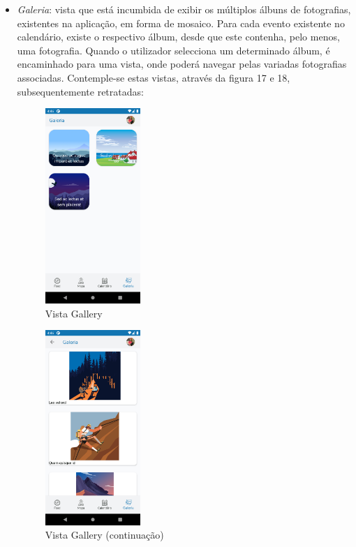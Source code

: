\documentclass[12pt]{report}
\begin{document}
\begin{itemize}
    \item \emph{Galeria}: vista que está incumbida de exibir os múltiplos álbuns de fotografias, existentes na aplicação, em forma de mosaico. Para cada evento existente no calendário, existe o respectivo álbum, desde que este contenha, pelo menos, uma fotografia. Quando o utilizador selecciona um determinado álbum, é encaminhado para uma vista, onde poderá navegar pelas variadas fotografias associadas. Contemple-se estas vistas, através da figura 17 e 18, subsequentemente retratadas: 

    \bigskip
    \begin{figure}[H]
        \centering
        \includegraphics[width=0.34\textwidth]{view-gallery-1.png}
        \caption{Vista Gallery}
    \end{figure}
    
    \bigskip
    \begin{figure}[H]
        \centering
        \includegraphics[width=0.34\textwidth]{view-gallery-2.png}
        \caption{Vista Gallery (continuação)}
    \end{figure}
\end{itemize}
\end{document}
